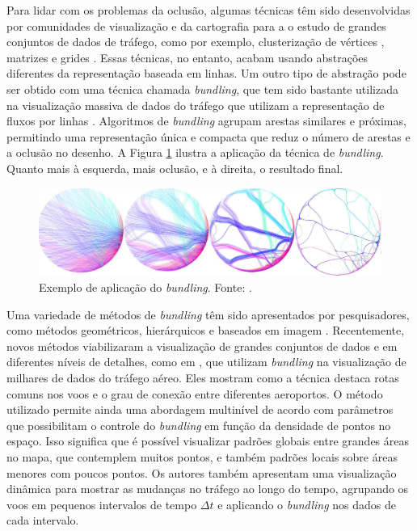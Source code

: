   Para lidar com os problemas da oclusão, algumas técnicas têm sido
desenvolvidas por comunidades de visualização e da cartografia para a o estudo
de grandes conjuntos de dados de tráfego, como por exemplo, clusterização de
vértices \citep{Schaeffer2007,Andrienko2011}, matrizes \citep{Elmqvist2008}
e grides \citep{JoWood2010}. Essas técnicas, no entanto, acabam usando
abstrações diferentes da representação baseada em linhas. Um outro tipo de
abstração pode ser obtido com uma técnica chamada \emph{bundling}, que tem sido
bastante utilizada na visualização massiva de dados do tráfego que utilizam a
representação de fluxos por linhas \citep{Zhou2013}. Algoritmos de
\emph{bundling} agrupam arestas similares e próximas, permitindo uma
representação única e compacta que reduz o número de arestas e a oclusão no
desenho. A Figura \ref{fig:exemplo-bund} ilustra a aplicação da técnica de
\emph{bundling}.  Quanto mais à esquerda, mais oclusão, e à direita, o
resultado final.

\begin{figure}[!htb]
  \centering
  \includegraphics[width=1\textwidth]{../figuras/bundle-ex.png}
\caption[Exemplo de aplicação do \emph{bundling}]{Exemplo de aplicação do \emph{bundling}. Fonte: \citet{Hurter2012}.}
  \label{fig:exemplo-bund}
\end{figure}

  Uma variedade de métodos de \emph{bundling} têm sido apresentados por
pesquisadores, como métodos geométricos, hierárquicos e baseados em imagem
\citep{Lhuillier2017}. Recentemente, novos métodos viabilizaram a visualização
de grandes conjuntos de dados e em diferentes níveis de detalhes, como em
\citet{Klein2014}, que utilizam \emph{bundling} na visualização de milhares de
dados do tráfego aéreo. Eles mostram como a técnica destaca rotas comuns nos
voos e o grau de conexão entre diferentes aeroportos. O método utilizado
permite ainda uma abordagem multinível de acordo com parâmetros que
possibilitam o controle do \emph{bundling} em função da densidade de pontos no
espaço. Isso significa que é possível visualizar padrões globais entre grandes
áreas no mapa, que contemplem muitos pontos, e também padrões locais sobre
áreas menores com poucos pontos. Os autores também apresentam uma visualização
dinâmica para mostrar as mudanças no tráfego ao longo do tempo, agrupando os
voos em pequenos intervalos de tempo $\Delta t$ e aplicando o \emph{bundling}
nos dados de cada intervalo.

